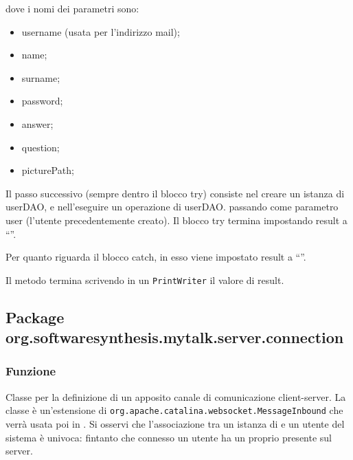 \begin{description}
	dove i nomi dei parametri sono:
	\begin{itemize}
		\item username (usata per l'indirizzo mail);
		\item name;
		\item surname;
		\item password;
		\item answer;
		\item question;
		\item picturePath;
	\end{itemize}
	Il passo successivo (sempre dentro il blocco try) consiste nel creare un istanza di  userDAO, e nell'eseguire un operazione di userDAO. passando come parametro user (l'utente precedentemente creato). Il blocco try termina impostando result a ``''.
	
	Per quanto riguarda il blocco catch, in esso viene impostato result a ``''.
	
	Il metodo termina scrivendo in un \texttt{PrintWriter} il valore di result.
\end{description}


\subsection{Package org.softwaresynthesis.mytalk.server.connection}\label{sec:connection}


\subsubsection*{Funzione}
Classe per la definizione di un apposito canale di comunicazione client-server. La classe è un'estensione di \texttt{org.apache.catalina.websocket.MessageInbound} che verrà usata poi in . Si osservi che l'associazione tra un istanza di  e un utente del sistema è univoca: fintanto che connesso un utente ha un proprio  presente sul server.

